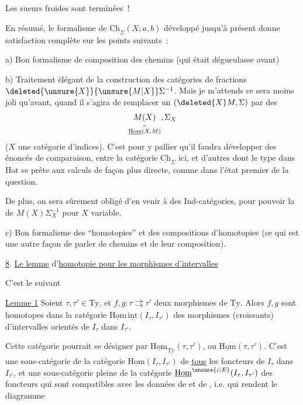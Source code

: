 Les sueurs froides sont terminées~!

En résumé, le formalisme de  $\underline{\mathrm{Ch}}_\Sigma(X;a,b)$ développé jusqu'à présent donne satisfaction complète sur les points suivants~:

a) Bon formalisme de composition des chemins (qui était dégueulasse avant)

b) Traitement élégant de la construction des catégories de fractions $\deleted{\unsure{X}}{\unsure{M|X}}\Sigma^{-1}$. Mais je m'attends  ce sera moins joli qu'avant, quand il s'agira de remplacer un $(\deleted{X}M,\Sigma)$ par des
\[
\underset{\substack{\shortparallel\\\underline{\mathrm{Hom}}(X,M)}}{M(X)},\Sigma_X
\]
($X$ une catégorie d'indices). C'est pour y pallier qu'il  faudra développer des énoncés de comparaison, entre la catégorie $\underline{\mathrm{Ch}}_\Sigma$  ici, et d'autres  dont le type dans $\mathrm{Hot}$ se prête aux calculs de façon plus directe, comme dans l'état premier de la question.

De plus, on sera sûrement obligé d'en venir à des Ind-catégories, pour pouvoir  la  de $M(X)\Sigma_X^{-1}$ pour $X$ variable.

c) Bon formalisme des ``homotopies'' et des compositions d'homotopies (ce qui est une autre façon de parler de chemins et de leur composition).

\uline{8}. \uline{Le lemme} d'\uline{homotopie pour les morphismes d'intervalles}

C'est le suivant

\uline{Lemme 1} Soient $\tau,\tau'\in\mathrm{Ty}$, et $f,g:\tau\rightrightarrows\tau'$ deux morphismes de $\underline{\mathrm{Ty}}$. Alors $f,g$ sont homotopes dans la catégorie $\underline{\mathrm{Hom}}\,\underline{\mathrm{int}}(I_\tau,I_{\tau'})$ des morphismes (croissants) d'intervalles orientés de $I_\tau$ dans $I_{\tau'}$.

Cette catégorie pourrait  se désigner par $\underline{\mathrm{Hom}}_{\underline{\mathrm{Ty}}}(\tau,\tau')$, ou $\underline{\mathrm{Hom}}(\tau,\tau')$. C'est une sous-catégorie  de la catégorie $\underline{\mathrm{Hom}}(I_\tau,I_{\tau'})$ de \uline{tous} les foncteurs de $I_\tau$ dans $I_{\tau'}$, et une sous-catégorie pleine de la catégorie $\underline{\mathrm{Hom}}^{\unsure{\varepsilon|E}}(I_\tau,I_{\tau'})$ des foncteurs  qui sont compatibles avec les données de  et de , i.e. qui rendent  le diagramme

